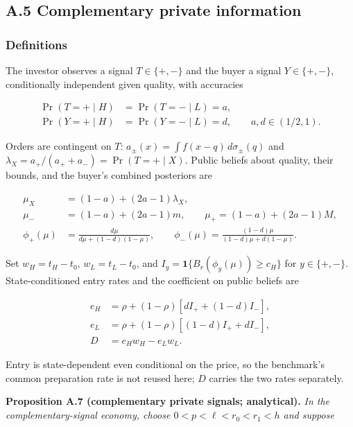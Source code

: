 \documentclass[
  12pt,
]{article}
\begin{document}
\subsection{A.5 Complementary private information}\label{pa-signals}

\subsubsection{Definitions}\label{definitions}

The investor observes a signal \(T\in\{+,-\}\) and the buyer a signal
\(Y\in\{+,-\}\), conditionally independent given quality, with
accuracies

\[
\begin{aligned}
\Pr(T=+\mid H)&=\Pr(T=-\mid L)=a,\\
\Pr(Y=+\mid H)&=\Pr(Y=-\mid L)=d,
\qquad a,d\in(1/2,1).
\end{aligned}
\tag{A.26}\label{eq:paper-a-26}
\]

Orders are contingent on \(T\): \(a_\pm(x)=\int f(x-q)\,d\sigma_\pm(q)\)
and \(\lambda_X=a_+/(a_++a_-)=\Pr(T=+\mid X)\). Public beliefs about
quality, their bounds, and the buyer's combined posteriors are

\[
\begin{aligned}
\mu_X&=(1-a)+(2a-1)\lambda_X,\\
\mu_-&=(1-a)+(2a-1)m,\qquad \mu_+=(1-a)+(2a-1)M,\\
\phi_+(\mu)&=\frac{d\mu}{d\mu+(1-d)(1-\mu)},\qquad
\phi_-(\mu)=\frac{(1-d)\mu}{(1-d)\mu+d(1-\mu)}.
\end{aligned}
\tag{A.27}\label{eq:paper-a-27}
\]

Set \(w_H=t_H-t_0\), \(w_L=t_L-t_0\), and
\(I_y=\mathbf1\{B_r(\phi_y(\mu))\ge c_H\}\) for \(y\in\{+,-\}\).
State-conditioned entry rates and the coefficient on public beliefs are

\[
\begin{aligned}
e_H&=\rho+(1-\rho)[dI_++(1-d)I_-],\\
e_L&=\rho+(1-\rho)[(1-d)I_++dI_-],\\
D&=e_Hw_H-e_Lw_L.
\end{aligned}
\tag{A.28}\label{eq:paper-a-28}
\]

Entry is state-dependent even conditional on the price, so the
benchmark's common preparation rate is not reused here; \(D\) carries
the two rates separately.


\protect{}\label{result-proposition-a-7}{\textbf{Proposition
A.7 (complementary private signals; analytical).}} \emph{In the
complementary-signal economy, choose \(0<p<\ell<r_0<r_1<h\) and suppose}
\end{document}
